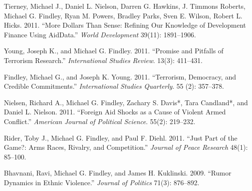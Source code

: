 \documentclass[10pt]{article}
\begin{document}
\begin{etaremune}
\item Tierney, Michael J., Daniel L. Nielson, Darren G. Hawkins, J. Timmons Roberts, Michael G. Findley, Ryan M. Powers, Bradley Parks, Sven E. Wilson, Robert L. Hicks. 2011. ``More Dollars Than Sense: Refining Our Knowledge of Development Finance Using AidData.'' \textit{World Development} 39(11): 1891--1906. 

\item Young, Joseph K., and Michael G. Findley. 2011. ``Promise and Pitfalls of Terrorism Research.'' \textit{International Studies Review}. 13(3): 411--431. 


\item Findley, Michael G., and Joseph K. Young. 2011. ``Terrorism, Democracy, and Credible Commitments.'' \textit{International Studies Quarterly}. 55 (2): 357--378. 



\item Nielsen, Richard A., Michael G. Findley, Zachary S. Davis*, Tara Candland*, and Daniel L. Nielson. 2011. ``Foreign Aid Shocks as a Cause of Violent Armed Conflict.'' \textit{American Journal of Political Science}. 55(2): 219--232.  



\item  Rider, Toby J., Michael G. Findley, and Paul F. Diehl. 2011. ``Just Part of the Game?: Arms Races, Rivalry, and Competition.'' \textit{Journal of Peace Research} 48(1): 85--100. 


\item Bhavnani, Ravi, Michael G. Findley, and James H. Kuklinski. 2009. ``Rumor Dynamics in Ethnic Violence.'' \textit{Journal of Politics} 71(3): 876--892. 




\end{etaremune}
\end{document}
